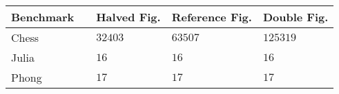 
\begin{tabular}{lllll}
	Benchmark	& \phantom{Key Fig.}			& Halved Fig.	& Reference Fig.	& Double Fig.	\\ \hline
	Chess		& \phantom{No. Tiles}			& $32403$		& $63507$			& $125319$		\\
	Julia		& \phantom{No. Iterations}		& $16$			& $16$				& $16$			\\
	Phong		& \phantom{Texture Resolution}	& $17$ 		& $17$ 				& $17$			\\
\end{tabular} %

